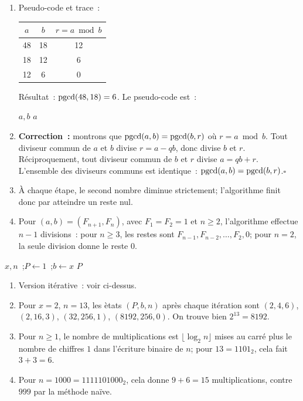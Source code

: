 \begin{enumerate}
  \item Pseudo-code et trace~:
\begin{center}
\renewcommand{\arraystretch}{1.25}
\begin{tabular}{ccc}
\toprule
$a$ & $b$ & $r=a\bmod b$ \\ \midrule
48 & 18 & 12 \\
18 & 12 & 6 \\
12 & 6 & 0 \\
\bottomrule
\end{tabular}
\end{center}
R\'esultat~: $\operatorname{pgcd}(48,18)=6$.
Le pseudo-code est~:
\begin{algorithm}[H]
\caption{PGCD par l'algorithme d'Euclide}
\Lire $a,b$\;
\Afficher $a$\;
\end{algorithm}
  \item \textbf{Correction~:} montrons que $\operatorname{pgcd}(a,b)=\operatorname{pgcd}(b,r)$ o\`u $r=a\bmod b$.
        Tout diviseur commun de $a$ et $b$ divise $r=a-qb$,
        donc divise $b$ et $r$. R\'eciproquement, tout diviseur commun de $b$
        et $r$ divise $a=qb+r$. L'ensemble des diviseurs communs est identique~:
        $\operatorname{pgcd}(a,b)=\operatorname{pgcd}(b,r)$.\hfill$\square$
  \item À chaque étape, le second nombre diminue strictement; l'algorithme finit
        donc par atteindre un reste nul.
  \item Pour $(a,b)=(F_{n+1},F_n)$, avec $F_1=F_2=1$ et $n\geq2$,
        l'algorithme effectue $n-1$ divisions~: pour $n\geq3$,
        les restes sont $F_{n-1},F_{n-2},\ldots,F_2,0$;
        pour $n=2$, la seule division donne le reste $0$.
\end{enumerate}


\begin{algorithm}[H]
\caption{Exponentiation rapide (it\'erative)}
\Lire $x, n$~;\quad $P \leftarrow 1$~;\quad $b \leftarrow x$\;
\Afficher $P$\;
\end{algorithm}

\begin{enumerate}
  \item Version it\'erative~: voir ci-dessus.
  \item Pour $x=2$, $n=13$, les \`etats $(P,b,n)$ apr\`es chaque it\'eration sont
        $(2,4,6)$, $(2,16,3)$, $(32,256,1)$, $(8192,256,0)$.
        On trouve bien $2^{13}=8192$.
  \item Pour $n\geq1$, le nombre de multiplications est
        $\lfloor\log_2 n\rfloor$ mises au carr\'e plus le nombre de chiffres
        $1$ dans l'\'ecriture binaire de $n$; pour $13=1101_2$, cela fait $3+3=6$.
  \item Pour $n=1000=1111101000_2$, cela donne $9+6=15$
        multiplications, contre $999$ par la m\'ethode na\"ive.
\end{enumerate}

